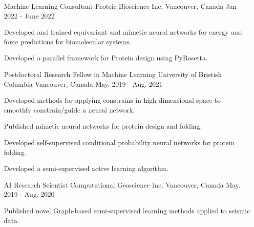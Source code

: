 

\begin{cventries}

  \cventry
    {Machine Learning Consultant} %
    {Proteic Bioscience Inc.} %
    {Vancouver, Canada} %
    {Jan 2022 - June 2022} %
    {
      \begin{cvitems} %
        \item {Developed and trained equivariant and mimetic neural networks for energy and force predictions for biomolecular systems.}
        \item {Developed a parallel framework for Protein design using PyRosetta.}
      \end{cvitems}
    }

  \cventry
    {Postdoctoral Research Fellow in Machine Learning} %
    {University of Bristish Columbia} %
    {Vancouver, Canada} %
    {May. 2019 - Aug. 2021} %
    {
      \begin{cvitems} %
        \item {Developed methods for applying constrains in high dimensional space to smoothly constrain/guide a neural network.}
        \item {Published mimetic neural networks for protein design and folding.}
        \item {Developed self-supervised conditional probability neural networks for protein folding.}
        \item {Developed a semi-supervised active learning algorithm.}
      \end{cvitems}
    }

  \cventry
    {AI Research Scientist} %
    {Computational Geoscience Inc.} %
    {Vancouver, Canada} %
    {May. 2019 - Aug. 2020} %
    {
      \begin{cvitems} %
        \item {Published novel Graph-based semi-supervised learning methods applied to seismic data.}
      \end{cvitems}
    }


\end{cventries}
